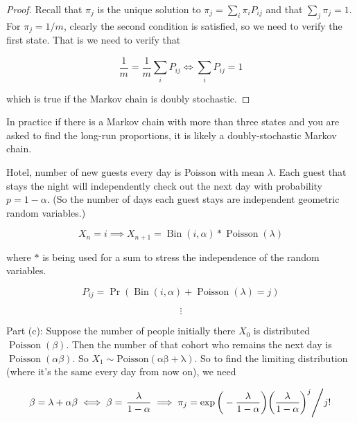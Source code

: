 \begin{proof}Recall that \(\pi_j\) is the unique solution to \(\pi_j = \sum_i \pi_i P_{ij}\) and that \(\sum_j \pi_j = 1\). For \(\pi_j = 1/m\), clearly the second condition is satisfied, so we need to verify the first state. That is we need to verify that

\[
\frac{1}{m} = \frac{1}{m} \sum_i P_{ij} \iff  \sum_i P_{ij}  = 1
\]

which is true if the Markov chain is doubly stochastic.

\end{proof}

\begin{remark}In practice if there is a Markov chain with more than three states and you are asked to find the long-run proportions, it is likely a doubly-stochastic Markov chain.

\end{remark}

\begin{example}Hotel, number of new guests every day is Poisson with mean \(\lambda\). Each guest that stays the night will independently check out the next day with probability \(p = 1 -\alpha\). (So the number of days each guest stays are independent geometric random variables.)

\[
X_n = i \implies X_{n+1} = \operatorname{Bin}(i, \alpha) * \operatorname{Poisson}(\lambda)
\]

where \(*\) is being used for a sum to stress the independence of the random variables.

\[
P_{ij} = \Pr( \operatorname{Bin}(i, \alpha) + \operatorname{Poisson}(\lambda) = j) 
\]

\[
\vdots
\]

Part (c): Suppose the number of people initially there \(X_0\) is distributed \(\operatorname{Poisson}(\beta)\). Then the number of that cohort who remains the next day is \(\operatorname{Poisson}(\alpha \beta)\). So \(X_1 \sim \operatorname{Poisson(\alpha \beta + \lambda)}\). So to find the limiting distribution (where it's the same every day from now on), we need

\[
\beta = \lambda + \alpha \beta \iff \beta =  \left. \frac{\lambda}{1- \alpha} \implies \pi_j = \exp \bigg(- \frac{\lambda}{1 - \alpha} \bigg) \bigg( \frac{\lambda}{1 - \alpha} \bigg)^j    \middle/ j! \right.
\]

\end{example}

